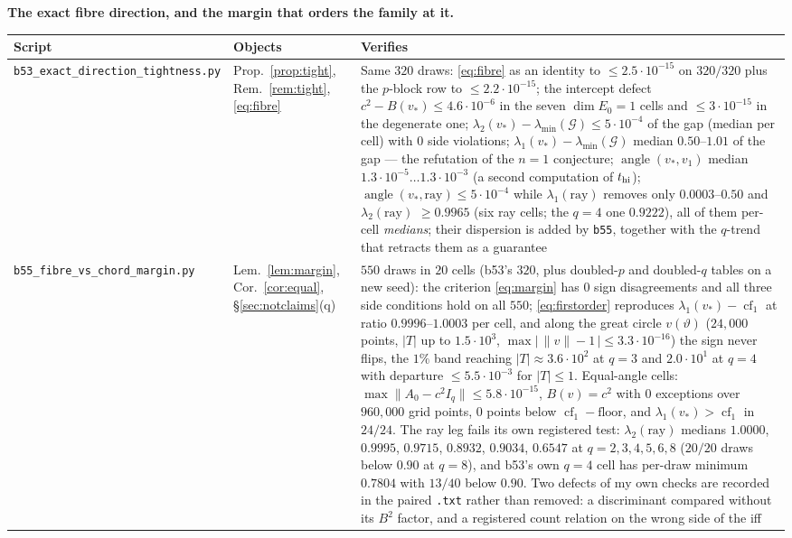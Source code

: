 \documentclass[11pt]{article}
\theoremstyle{remark}
\newcommand{\Gr}{\mathcal{G}}
\begin{document}
\noindent\textbf{The exact fibre direction, and the margin that orders the family at it.}
\begin{center}\footnotesize\begin{tabular}{@{}>{\raggedright\arraybackslash}p{5.1cm}%
>{\raggedright\arraybackslash}p{2.5cm}>{\raggedright\arraybackslash}p{5.8cm}@{}}
\toprule Script & Objects & Verifies\\
\midrule
\texttt{b53\_exact\_direction\_\allowbreak tightness.py} & Prop.~\ref{prop:tight}, Rem.~\ref{rem:tight},
\eqref{eq:fibre} & Same $320$ draws: \eqref{eq:fibre} as an identity to $\le2.5\cdot10^{-15}$ on
$320/320$ plus the $p$-block row to $\le2.2\cdot10^{-15}$; the intercept defect
$c^{2}-B(v_\ast)\le4.6\cdot10^{-6}$ in the seven $\operatorname{dim}E_0=1$ cells and $\le3\cdot10^{-15}$
in the degenerate one;
$\lambda_2(v_\ast)-\lambda_{\min}(\Gr)\le5\cdot10^{-4}$ of the gap (median per cell) with $0$ side
violations; $\lambda_1(v_\ast)-\lambda_{\min}(\Gr)$ median $0.50$--$1.01$ of the gap --- the refutation
of the $n=1$ conjecture; $\operatorname{angle}(v_\ast,v_1)$ median $1.3\cdot10^{-5}\ldots1.3\cdot10^{-3}$
(a second computation of $t_{\rm hi}$); $\operatorname{angle}(v_\ast,\text{ray})\le5\cdot10^{-4}$ while
$\lambda_1(\text{ray})$ removes only $0.0003$--$0.50$ and $\lambda_2(\text{ray})$ $\ge0.9965$ (six ray
cells; the $q=4$ one $0.9222$), all of them per-cell \emph{medians}; their dispersion is added by
\texttt{b55}, together with the $q$-trend that retracts them as a guarantee\\
\texttt{b55\_fibre\_vs\_chord\_\allowbreak margin.py} & Lem.~\ref{lem:margin}, Cor.~\ref{cor:equal},
\S\ref{sec:notclaims}(q) & $550$ draws in $20$ cells (b53's $320$, plus doubled-$p$ and doubled-$q$
tables on a new seed): the criterion \eqref{eq:margin} has $0$ sign disagreements and all three side
conditions hold on all $550$; \eqref{eq:firstorder} reproduces $\lambda_1(v_\ast)-\operatorname{cf}_1$
at ratio $0.9996$--$1.0003$ per cell, and along the great circle $v(\vartheta)$ ($24{,}000$ points,
$|T|$ up to $1.5\cdot10^{3}$, $\max|\,\|v\|-1\,|\le3.3\cdot10^{-16}$) the sign never flips, the $1\%$
band reaching $|T|\approx3.6\cdot10^{2}$ at $q=3$ and $2.0\cdot10^{1}$ at $q=4$ with departure
$\le5.5\cdot10^{-3}$ for $|T|\le1$. Equal-angle cells: $\max\|A_0-c^{2}I_q\|\le5.8\cdot10^{-15}$,
$B(v)=c^{2}$ with $0$ exceptions over $960{,}000$ grid points, $0$ points below
$\operatorname{cf}_1-\text{floor}$, and $\lambda_1(v_\ast)>\operatorname{cf}_1$ in $24/24$.
The ray leg fails its own registered test: $\lambda_2(\text{ray})$ medians $1.0000$, $0.9995$, $0.9715$,
$0.8932$, $0.9034$, $0.6547$ at $q=2,3,4,5,6,8$ ($20/20$ draws below $0.90$ at $q=8$), and b53's own
$q=4$ cell has per-draw minimum $0.7804$ with $13/40$ below $0.90$. Two defects of my own checks are
recorded in the paired \texttt{.txt} rather than removed: a discriminant compared without its $B^{2}$
factor, and a registered count relation on the wrong side of the iff\\
\bottomrule
\end{tabular}\end{center}
\end{document}
